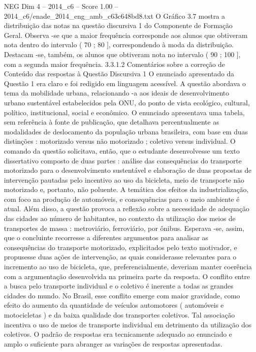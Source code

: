 \begin{textsample}{NEG Dim 4 – 2014\_c6 – Score 1.00 – 2014\_c6/enade\_2014\_eng\_amb\_c63c648bd8.txt}
O Gráfico 3.7 mostra a distribuição das notas na questão discursiva 1 do Componente de Formação Geral.
Observa -se que a maior frequência corresponde aos alunos que obtiveram nota dentro do intervalo ( 70 ; 80 ], correspondendo à moda da distribuição.
Destacam -se, também, os alunos que obtiveram nota no intervalo ( 90 ; 100 ], com a segunda maior frequência. 3.3.1.2 Comentários sobre a correção de Conteúdo das respostas à Questão Discursiva 1 O enunciado apresentado da Questão 1 era claro e foi redigido em linguagem acessível.
A questão abordava o tema da mobilidade urbana, relacionando -a aos ideais de desenvolvimento urbano sustentável estabelecidos pela ONU, do ponto de vista ecológico, cultural, político, institucional, social e econômico.
O enunciado apresentava uma tabela, sem referência à fonte de publicação, que detalhava percentualmente as modalidades de deslocamento da população urbana brasileira, com base em duas distinções : motorizado versus não motorizado ; coletivo versus individual.
O comando da questão solicitava, então, que o estudante desenvolvesse um texto dissertativo composto de duas partes : análise das consequências do transporte motorizado para o desenvolvimento sustentável e elaboração de duas propostas de intervenção pautadas pelo incentivo ao uso da bicicleta, meio de transporte não motorizado e, portanto, não poluente.
A temática dos efeitos da industrialização, com foco na produção de automóveis, e consequências para o meio ambiente é atual.
Além disso, a questão provoca a reflexão sobre a necessidade de adequação das cidades ao número de habitantes, no contexto da utilização dos meios de transportes de massa : metroviário, ferroviário, por ônibus.
Esperava -se, assim, que o concluinte recorresse a diferentes argumentos para analisar as consequências do transporte motorizado, explicitados pelo texto motivador, e propusesse duas ações de intervenção, as quais considerasse relevantes para o incremento ao uso de bicicleta, que, preferencialmente, deveriam manter coerência com a argumentação desenvolvida na primeira parte da resposta.
O conflito entre a busca pelo transporte individual e o coletivo é inerente a todas as grandes cidades do mundo.
No Brasil, esse conflito emerge com maior gravidade, como efeito do aumento da quantidade de veículos automotores ( automóveis e motocicletas ) e da baixa qualidade dos transportes coletivos.
Tal associação incentiva o uso de meios de transporte individual em detrimento da utilização dos coletivos.
O padrão de respostas era tecnicamente adequado ao enunciado e amplo o suficiente para abranger as variações de respostas apresentadas.

\end{textsample}
